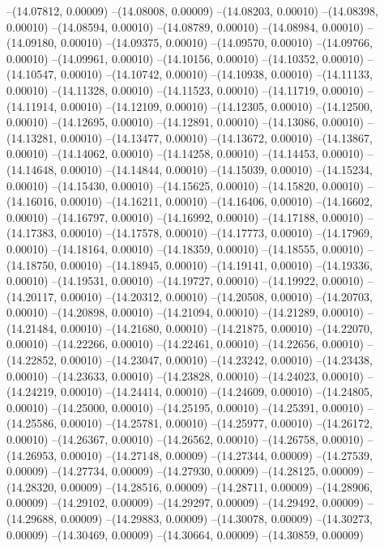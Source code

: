 --(14.07812, 0.00009)
--(14.08008, 0.00009)
--(14.08203, 0.00010)
--(14.08398, 0.00010)
--(14.08594, 0.00010)
--(14.08789, 0.00010)
--(14.08984, 0.00010)
--(14.09180, 0.00010)
--(14.09375, 0.00010)
--(14.09570, 0.00010)
--(14.09766, 0.00010)
--(14.09961, 0.00010)
--(14.10156, 0.00010)
--(14.10352, 0.00010)
--(14.10547, 0.00010)
--(14.10742, 0.00010)
--(14.10938, 0.00010)
--(14.11133, 0.00010)
--(14.11328, 0.00010)
--(14.11523, 0.00010)
--(14.11719, 0.00010)
--(14.11914, 0.00010)
--(14.12109, 0.00010)
--(14.12305, 0.00010)
--(14.12500, 0.00010)
--(14.12695, 0.00010)
--(14.12891, 0.00010)
--(14.13086, 0.00010)
--(14.13281, 0.00010)
--(14.13477, 0.00010)
--(14.13672, 0.00010)
--(14.13867, 0.00010)
--(14.14062, 0.00010)
--(14.14258, 0.00010)
--(14.14453, 0.00010)
--(14.14648, 0.00010)
--(14.14844, 0.00010)
--(14.15039, 0.00010)
--(14.15234, 0.00010)
--(14.15430, 0.00010)
--(14.15625, 0.00010)
--(14.15820, 0.00010)
--(14.16016, 0.00010)
--(14.16211, 0.00010)
--(14.16406, 0.00010)
--(14.16602, 0.00010)
--(14.16797, 0.00010)
--(14.16992, 0.00010)
--(14.17188, 0.00010)
--(14.17383, 0.00010)
--(14.17578, 0.00010)
--(14.17773, 0.00010)
--(14.17969, 0.00010)
--(14.18164, 0.00010)
--(14.18359, 0.00010)
--(14.18555, 0.00010)
--(14.18750, 0.00010)
--(14.18945, 0.00010)
--(14.19141, 0.00010)
--(14.19336, 0.00010)
--(14.19531, 0.00010)
--(14.19727, 0.00010)
--(14.19922, 0.00010)
--(14.20117, 0.00010)
--(14.20312, 0.00010)
--(14.20508, 0.00010)
--(14.20703, 0.00010)
--(14.20898, 0.00010)
--(14.21094, 0.00010)
--(14.21289, 0.00010)
--(14.21484, 0.00010)
--(14.21680, 0.00010)
--(14.21875, 0.00010)
--(14.22070, 0.00010)
--(14.22266, 0.00010)
--(14.22461, 0.00010)
--(14.22656, 0.00010)
--(14.22852, 0.00010)
--(14.23047, 0.00010)
--(14.23242, 0.00010)
--(14.23438, 0.00010)
--(14.23633, 0.00010)
--(14.23828, 0.00010)
--(14.24023, 0.00010)
--(14.24219, 0.00010)
--(14.24414, 0.00010)
--(14.24609, 0.00010)
--(14.24805, 0.00010)
--(14.25000, 0.00010)
--(14.25195, 0.00010)
--(14.25391, 0.00010)
--(14.25586, 0.00010)
--(14.25781, 0.00010)
--(14.25977, 0.00010)
--(14.26172, 0.00010)
--(14.26367, 0.00010)
--(14.26562, 0.00010)
--(14.26758, 0.00010)
--(14.26953, 0.00010)
--(14.27148, 0.00009)
--(14.27344, 0.00009)
--(14.27539, 0.00009)
--(14.27734, 0.00009)
--(14.27930, 0.00009)
--(14.28125, 0.00009)
--(14.28320, 0.00009)
--(14.28516, 0.00009)
--(14.28711, 0.00009)
--(14.28906, 0.00009)
--(14.29102, 0.00009)
--(14.29297, 0.00009)
--(14.29492, 0.00009)
--(14.29688, 0.00009)
--(14.29883, 0.00009)
--(14.30078, 0.00009)
--(14.30273, 0.00009)
--(14.30469, 0.00009)
--(14.30664, 0.00009)
--(14.30859, 0.00009)
